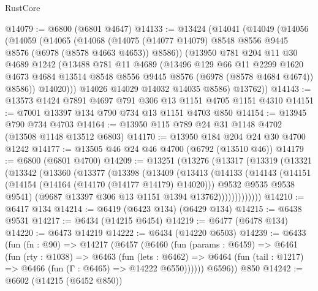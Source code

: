 \begin{lexlean}{RustCore}
\begin{coremodule}
@14079 := @6800 (@6801 @4647)
@14133 := @13424
    (@14041
      (@14049
        (@14056
          (@14059
            (@14065
              (@14068
                (@14075 (@14077 @14079) @8548 @8556 @9445 @8576 (@6978 (@8578 @4663 @4653)) @8586))
              (@13950
                @781
                @204
                @11
                @30
                @4689
                @1242
                (@13488
                  @781
                  @11
                  @4689
                  (@13496
                    @129
                    @66
                    @11
                    @2299
                    @1620
                    @4673
                    @4684
                    @13514
                    @8548
                    @8556
                    @9445
                    @8576
                    (@6978 (@8578 @4684 @4674))
                    @8586))
                @14020)))
          @14026
          @14029
          @14032
          @14035
          @8586)
        @13762))
@14143 := @13573 @1424 @7891 @4697 @791 @306 @13 @1151 @4705 @1151 @4310
@14151 := @7001 @13397 @134 @790 @734 @13 @1151 @4703 @850
@14154 := @13945 @790 @734 @4703
@14164 := @13950 @115 @789 @24 @31 @1148 @4702 (@13508 @1148 @13512 @6803)
@14170 := @13950 @184 @204 @24 @30 @4700 @1242
@14177 := @13505 @46 @24 @46 @4700 (@6792 (@13510 @46))
@14179 := @6800 (@6801 @4700)
@14209 := @13251
    (@13276
      (@13317
        (@13319
          (@13321
            (@13342
              (@13360
                (@13377
                  (@13398
                    (@13409
                      (@13413
                        (@14133
                          (@14143
                            (@14151
                              (@14154 (@14164 (@14170 (@14177 @14179) @14020)))
                              @9532
                              @9535
                              @9538
                              @9541)
                            (@9687 @13397 @306 @13 @1151 @1394 @13762)))))))))))))
@14210 := @6417 @134
@14214 := @6419 (@6423 @134) (@6429 @134)
@14215 := @6438 @9531
@14217 := @6434 (@14215 @6454)
@14219 := @6477 (@6478 @134)
@14220 := @6473 @14219
@14222 := @6434 (@14220 @6503)
@14239 := @6433
    (fun (fn : @90) =>
    @14217
      (@6457
        (@6460
          (fun (params : @6459) =>
          @6461
            (fun (rty : @1038) =>
            @6463
              (fun (lets : @6462) =>
              @6464 (fun (tail : @1217) => @6466 (fun (Γ : @6465) => @14222 @6550))))))
        @6596))
    @850
@14242 := @6602 (@14215 (@6452 @850))

\end{coremodule}
\end{lexlean}
